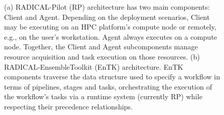 \documentclass[preprint,12pt, a4paper]{elsarticle}
\begin{document}
\begin{figure}
    \centering
    \qquad
    \caption{(a) RADICAL-Pilot (RP) architecture has two main components: Client
    and Agent. Depending on the deployment scenarios, Client may be executing on
    an HPC platform's compute node or remotely, e.g., on the user's workstation.
    Agent always executes on a compute node. Together, the Client and Agent
    subcomponents manage resource acquisition and task execution on those
    resources. (b) RADICAL-EnsembleToolkit (EnTK) architecture. EnTK components
    traverse the data structure used to specify a workflow in terms of
    pipelines, stages and tasks, orchestrating the execution of the workflow's
    tasks via a runtime system (currently RP) while respecting their precedence
    relationships.}\label{fig:archs}
\end{figure}

\end{document}
